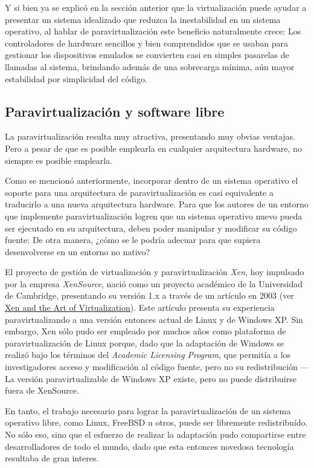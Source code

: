 \documentclass[11pt,fleqn]{book} %
\begin{document}
Y si bien ya se explicó en la sección anterior que la virtualización puede
ayudar a presentar un sistema idealizado que reduzca la inestabilidad
en un sistema operativo, al hablar de paravirtualización este
beneficio naturalmente crece: Los controladores de hardware sencillos
y bien comprendidos que se usaban para gestionar los
dispositivos emulados se convierten casi en simples pasarelas de
llamadas al sistema, brindando además de una sobrecarga mínima, aún
mayor estabilidad por simplicidad del código.
\subsection{Paravirtualización y software libre}
\label{sec-9-4-1}


La paravirtualización resulta muy atractiva, presentando muy obvias
ventajas. Pero a pesar de que es posible emplearla en cualquier
arquitectura hardware, no siempre es posible emplearla.

Como se mencionó anteriormente, incorporar dentro de un sistema operativo
 el soporte para una arquitectura de paravirtualización es casi equivalente a traducirlo a
una nueva arquitectura hardware. Para que los autores de un entorno que
implemente paravirtualización logren que un sistema operativo nuevo
pueda ser ejecutado en su arquitectura, deben poder manipular y
modificar su código fuente: De otra manera, ¿cómo se le podría adecuar
para que supiera desenvolverse en un entorno no nativo?

El proyecto de gestión de virtualización y paravirtualización \emph{Xen},
hoy impulsado por la empresa \emph{XenSource}, nació como un proyecto
académico de la Universidad de Cambridge, presentando su versión 1.x a
través de un artículo en 2003 (ver \href{http://www.cl.cam.ac.uk/netos/papers/2003-xensosp.pdf}{Xen and the Art of Virtualization}). Este artículo presenta su experiencia
paravirtualizando a una versión entonces actual de Linux y de Windows
XP. Sin embargo, Xen sólo pudo ser empleado por muchos años como
plataforma de paravirtualización de Linux porque, dado que la
adaptación de Windows se realizó bajo los términos del \emph{Academic Licensing Program}, que permitía a los investigadores acceso y
modificación al código fuente, pero no su redistribución — La versión
paravirtualizable de Windows XP existe, pero no puede distribuirse
fuera de XenSource.

En tanto, el trabajo necesario para lograr la paravirtualización de
un sistema operativo libre, como Linux, FreeBSD u otros, puede ser
libremente redistribuído. No sólo eso, sino que el esfuerzo de
realizar la adaptación pudo compartirse entre desarrolladores de todo
el mundo, dado que esta entonces novedosa tecnología resultaba de gran
interes.
\end{document}
